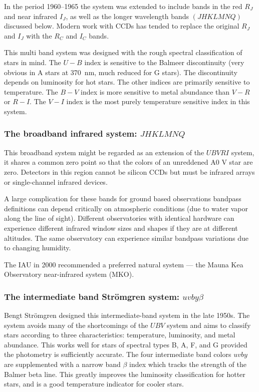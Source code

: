 In the period 1960--1965 the system was extended to include bands in
the red $R_J$ and near infrared $I_J$, as well as the longer
wavelength bands $(JHKLMNQ)$ discussed below. Modern work with CCDs
has tended to replace the original $R_J$ and $I_J$ with the $R_C$ and
$I_C$ bands. 

This multi band system was designed with the rough spectral
classification of stars in mind. The $U-B$ index is sensitive to the
Balmeer discontinuity (very obvious in A stars at 370~nm, much reduced
for G stars). The discontinuity  depends on luminosity for hot
stars. The other indices are primarily sensitive to temperature. The
$B-V$ index is more sensitive to metal abundance than $V-R$ or
$R-I$. The $V-I$ index is the most purely temperature sensitive index
in this system.

\subsubsection{The broadband infrared system: $JHKLMNQ$}
This broadband
system might be regarded as an extension of the $UBVRI$ system, it
shares a common zero point so that the colors of an unreddened A0 V
star are zero. Detectors in this region cannot be silicon CCDs but
must be infrared arrays or single-channel infrared devices. 

A large complication for these bands for ground based observations
bandpass definitions can depend critically on atmospheric conditions
(due to water vapor along the line of sight). Different observatories
with identical hardware can experience different infrared window sizes
and shapes if they are at different altitudes. The same observatory
can experience similar bandpass variations due to changing humidity. 

The IAU in 2000 recommended a preferred natural system --- the Mauna
Kea Observatory near-infrared system (MKO).

\subsubsection{The intermediate band Str\"omgren system: $uvby\beta$}
Bengt Str\"omgren designed this intermediate-band system in the late
1950s. The system avoids many of the shortcomings of the $UBV$ system
and aims to classify stars according to three characteristics:
temperature, luminosity, and metal abundance. This works well for
stars of spectral types B, A, F, and G provided the photometry is
sufficiently accurate. The four intermediate band colors $uvby$ are
supplemented with a narrow band $\beta$ index which tracks the
strength of the Balmer beta line. This greatly improves the
luminosity classification for hotter stars, and is a good temperature
indicator for cooler stars.

